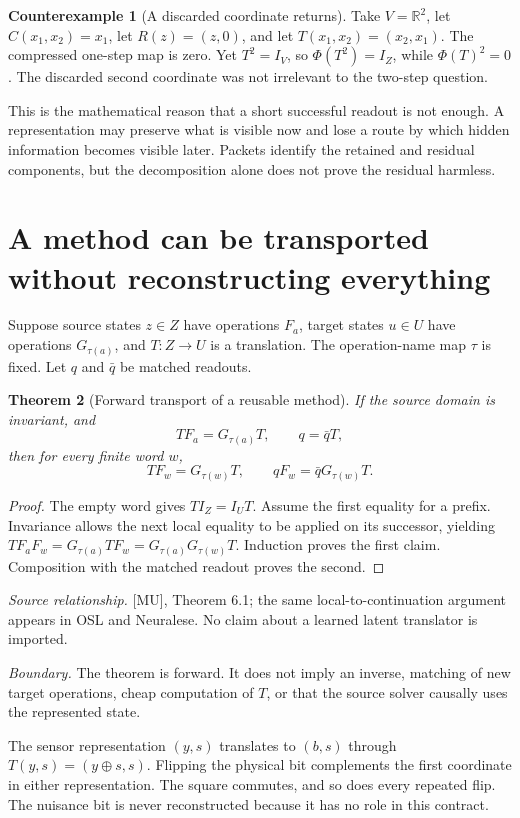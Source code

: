 \documentclass[11pt,oneside,openany]{book}
\newtheorem{theorem}{Theorem}[chapter]
\theoremstyle{definition}\newtheorem{definition}[theorem]{Definition}
\newtheorem{counterexample}[theorem]{Counterexample}
\newcommand{\source}[1]{\par{\small\textit{Source relationship.} #1}\par}
\newcommand{\boundary}[1]{\par{\small\textit{Boundary.} #1}\par}
\begin{document}
\begin{counterexample}[A discarded coordinate returns]\label{ce:return}
Take $V=\mathbb R^2$, let $C(x_1,x_2)=x_1$, let $R(z)=(z,0)$, and let $T(x_1,x_2)=(x_2,x_1)$. The compressed one-step map is zero. Yet $T^2=I_V$, so $\Phi(T^2)=I_Z$, while $\Phi(T)^2=0$. The discarded second coordinate was not irrelevant to the two-step question.
\end{counterexample}

This is the mathematical reason that a short successful readout is not enough. A representation may preserve what is visible now and lose a route by which hidden information becomes visible later. Packets identify the retained and residual components, but the decomposition alone does not prove the residual harmless.

\section{A method can be transported without reconstructing everything}
Suppose source states $z\in Z$ have operations $F_a$, target states $u\in U$ have operations $G_{\tau(a)}$, and $T:Z\to U$ is a translation. The operation-name map $\tau$ is fixed. Let $q$ and $\bar q$ be matched readouts.

\begin{theorem}[Forward transport of a reusable method]\label{r:transport}
If the source domain is invariant, and
\[
TF_a=G_{\tau(a)}T,\qquad q=\bar qT,
\]
then for every finite word $w$,
\[
TF_w=G_{\tau(w)}T,\qquad qF_w=\bar qG_{\tau(w)}T.
\]
\end{theorem}
\begin{proof}
The empty word gives $TI_Z=I_UT$. Assume the first equality for a prefix. Invariance allows the next local equality to be applied on its successor, yielding
$TF_aF_w=G_{\tau(a)}TF_w=G_{\tau(a)}G_{\tau(w)}T$.
Induction proves the first claim. Composition with the matched readout proves the second.
\end{proof}
\source{[MU], Theorem 6.1; the same local-to-continuation argument appears in OSL and Neuralese. No claim about a learned latent translator is imported.}
\boundary{The theorem is forward. It does not imply an inverse, matching of new target operations, cheap computation of $T$, or that the source solver causally uses the represented state.}

The sensor representation $(y,s)$ translates to $(b,s)$ through $T(y,s)=(y\oplus s,s)$. Flipping the physical bit complements the first coordinate in either representation. The square commutes, and so does every repeated flip. The nuisance bit is never reconstructed because it has no role in this contract.
\end{document}
